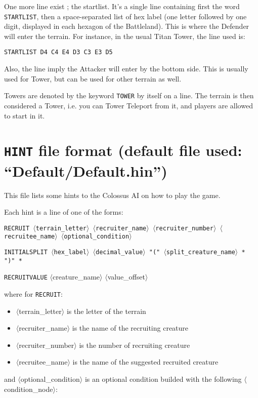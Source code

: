 \documentclass{article}
\begin{document}
One more line exist ; the startlist. It's a single line containing first the word \texttt{STARTLIST}, then a space-separated list of hex label (one letter followed by one digit, displayed in each hexagon of the Battleland). This is where the Defender will enter the terrain. For instance, in the usual Titan Tower, the line used is:

\texttt{STARTLIST D4 C4 E4 D3 C3 E3 D5}

Also, the line imply the Attacker will enter by the bottom side. This is usually used for Tower, but can be used for other terrain as well.

Towers are denoted by the keyword \texttt{TOWER} by itself on a line. The terrain is then considered a Tower, i.e. you can Tower Teleport from it, and players are allowed to start in it.

\section{\texttt{HINT} file format (default file used: ``Default/Default.hin'')}

This file lists some hints to the Colossus AI on how to play the game.

Each hint is a line of one of the forms:

\texttt{RECRUIT $\langle$terrain\_letter$\rangle$ $\langle$recruiter\_name$\rangle$ $\langle$recruiter\_number$\rangle$  $\langle$recruitee\_name$\rangle$ $\langle$optional\_condition$\rangle$}

\texttt{INITIALSPLIT $\langle$hex\_label$\rangle$ $\langle$decimal\_value$\rangle$ "(" $\langle$split\_creature\_name$\rangle$ * ")" *}

\texttt{RECRUITVALUE} $\langle$creature\_name$\rangle$ $\langle$value\_offset$\rangle$

where for \texttt{RECRUIT}:

\begin{itemize}
\item $\langle$terrain\_letter$\rangle$ is the letter of the terrain
\item $\langle$recruiter\_name$\rangle$ is the name of the recruiting creature
\item $\langle$recruiter\_number$\rangle$ is the number of recruiting creature
\item $\langle$recruitee\_name$\rangle$ is the name of the suggested recruited creature
\end{itemize}

and $\langle$optional\_condition$\rangle$ is an optional condition builded with the following $\langle$condition\_node$\rangle$:
\end{document}
